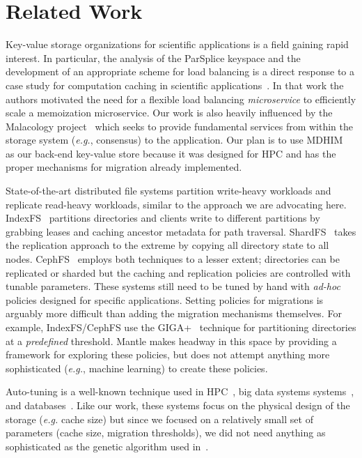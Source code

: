 \section{Related Work}

Key-value storage organizations for scientific applications is a field gaining
rapid interest. In particular, the analysis of the ParSplice keyspace and the
development of an appropriate scheme for load balancing is a direct response to
a case study for computation caching in scientific
applications~\cite{jenkins:ipdsw17-mochi}. In that work the authors motivated
the need for a flexible load balancing \emph{microservice} to efficiently scale
a memoization microservice. Our work is also heavily influenced by the
Malacology project~\cite{sevilla:eurosys17-malacology} which seeks to provide
fundamental services from within the storage system ({\it e.g.}, consensus) to
the application.  Our plan is to use
MDHIM~\cite{greenberg:hotstorage2015-mdhim} as our back-end key-value store
because it was designed for HPC and has the proper mechanisms for migration
already implemented.  

State-of-the-art distributed file systems partition write-heavy workloads and
replicate read-heavy workloads, similar to the approach we are advocating here.
IndexFS~\cite{ren:sc2014-indexfs} partitions directories and clients write to
different partitions by grabbing leases and caching ancestor metadata for path
traversal. ShardFS~\cite{xiao:socc15-shardfs} takes the replication approach to
the extreme by copying all directory state to all nodes.
CephFS~\cite{weil:sc2004-dyn-metadata, weil:osdi2006-ceph} employs both
techniques to a lesser extent; directories can be replicated or sharded but the
caching and replication policies are controlled with tunable parameters.  These
systems still need to be tuned by hand with {\it ad-hoc} policies designed for
specific applications.  Setting policies for migrations is arguably more
difficult than adding the migration mechanisms themselves.  For example,
IndexFS/CephFS use the GIGA+~\cite{patil:fast2011-giga} technique for
partitioning directories at a \emph{predefined} threshold. Mantle makes headway
in this space by providing a framework for exploring these policies, but does
not attempt anything more sophisticated ({\it e.g.}, machine learning) to
create these policies. 

Auto-tuning is a well-known technique used in
HPC~\cite{behzad:sc2013-autotuning}, big data systems
systems~\cite{herodotou_starfish_2011}, and
databases~\cite{schnaitter_index_2009}.  Like our work, these systems focus on
the physical design of the storage ({\it e.g.} cache size) but since we focused
on a relatively small set of parameters (cache size, migration thresholds), we
did not need anything as sophisticated as the genetic algorithm used
in~\cite{behzad:sc2013-autotuning}.

